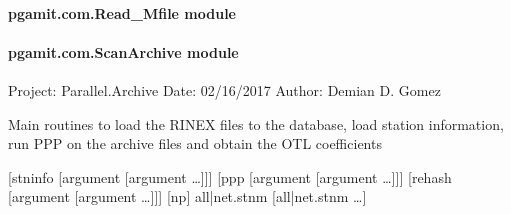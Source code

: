 \documentclass[letterpaper,10pt,english]{sphinxmanual}
\begin{document}
\paragraph{pgamit.com.Read\_Mfile module}
\label{\detokenize{pgamit.com:pgamit-com-read-mfile-module}}

\paragraph{pgamit.com.ScanArchive module}
\label{\detokenize{pgamit.com:module-pgamit.com.ScanArchive}}\label{\detokenize{pgamit.com:pgamit-com-scanarchive-module}}
\sphinxAtStartPar
Project: Parallel.Archive
Date: 02/16/2017
Author: Demian D. Gomez

\sphinxAtStartPar
Main routines to load the RINEX files to the database, load station
information, run PPP on the archive files and obtain the OTL coefficients
\begin{description}
\sphinxAtStartPar
{[}\sphinxhyphen{}stninfo {[}argument {[}argument …{]}{]}{]}
{[}\sphinxhyphen{}ppp {[}argument {[}argument …{]}{]}{]}
{[}\sphinxhyphen{}rehash {[}argument {[}argument …{]}{]}{]} {[}\sphinxhyphen{}np{]}
all|net.stnm {[}all|net.stnm …{]}

\end{description}
\end{document}
